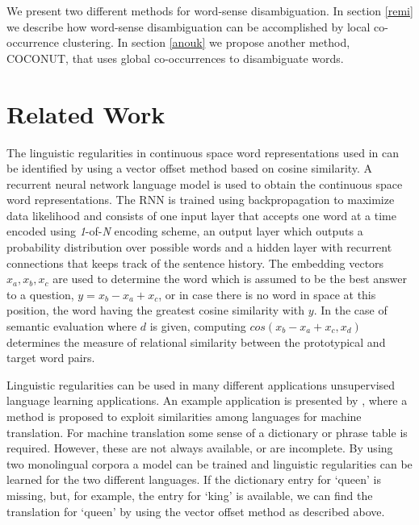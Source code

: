 \documentclass[11pt]{article}
\begin{document}
We present two different methods for word-sense disambiguation. In section \ref{remi} we describe how word-sense disambiguation can be accomplished by local co-occurrence clustering. In section \ref{anouk} we propose another method, COCONUT, that uses global co-occurrences to disambiguate words.

\section{Related Work}
The linguistic regularities in continuous space word representations used in \cite{Mikolov:13} can be identified by using a vector offset method based on cosine similarity. A recurrent neural network language model is used to obtain the continuous space word representations. The RNN is trained using backpropagation to maximize data likelihood and consists of one input layer that accepts one word at a time encoded using \textit{1}-of-\textit{N} encoding scheme, an output layer which outputs a probability distribution over possible words and a hidden layer with recurrent connections that keeps track of the sentence history. The embedding vectors $x_a, x_b, x_c$ are used to determine the word which is assumed to be the best answer to a question, $y = x_b - x_a + x_c$, or in case there is no word in space at this position, the word having the greatest cosine similarity with $y$. In the case of semantic evaluation where $d$ is given, computing $cos(x_b - x_a + x_c, x_d)$ determines the measure of relational similarity between the prototypical and target word pairs.

Linguistic regularities can be used in many different applications unsupervised language learning applications. An example application is presented by \cite{MikolovMT:13}, where a method is proposed to exploit similarities among languages for machine translation. For machine translation some sense of a dictionary or phrase table is required. However, these are not always available, or are incomplete. By using two monolingual corpora a model can be trained and linguistic regularities can be learned for the two different languages. If the dictionary entry for `queen' is missing, but, for example, the entry for `king' is available, we can find the translation for `queen' by using the vector offset method as described above.
\end{document}
